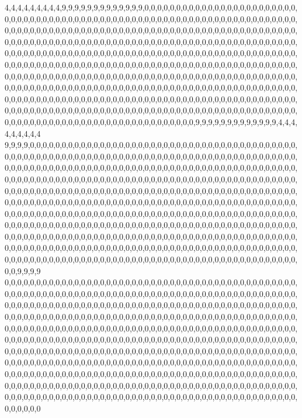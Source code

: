 4,4,4,4,4,4,4,4,4,9,9,9,9,9,9,9,9,9,9,9,9,9,0,0,0,0,0,0,0,0,0,0,0,0,0,0,0,0,0,0,0,0,0,0,0,0,0,0,0,0,0,0,0,0,0,0,0,0,0,0,0,0,0,0,0,0,0,0,0,0,0,0,0,0,0,0,0,0,0,0,0,0,0,0,0,0,0,0,0,0,0,0,0,0,0,0,0,0,0,0,0,0,0,0,0,0,0,0,0,0,0,0,0,0,0,0,0,0,0,0,0,0,0,0,0,0,0,0,0,0,0,0,0,0,0,0,0,0,0,0,0,0,0,0,0,0,0,0,0,0,0,0,0,0,0,0,0,0,0,0,0,0,0,0,0,0,0,0,0,0,0,0,0,0,0,0,0,0,0,0,0,0,0,0,0,0,0,0,0,0,0,0,0,0,0,0,0,0,0,0,0,0,0,0,0,0,0,0,0,0,0,0,0,0,0,0,0,0,0,0,0,0,0,0,0,0,0,0,0,0,0,0,0,0,0,0,0,0,0,0,0,0,0,0,0,0,0,0,0,0,0,0,0,0,0,0,0,0,0,0,0,0,0,0,0,0,0,0,0,0,0,0,0,0,0,0,0,0,0,0,0,0,0,0,0,0,0,0,0,0,0,0,0,0,0,0,0,0,0,0,0,0,0,0,0,0,0,0,0,0,0,0,0,0,0,0,0,0,0,0,0,0,0,0,0,0,0,0,0,0,0,0,0,0,0,0,0,0,0,0,0,0,0,0,0,0,0,0,0,0,0,0,0,0,0,0,0,0,0,0,0,0,0,0,0,0,0,0,0,0,0,0,0,0,0,0,0,0,0,0,0,0,0,0,0,0,0,0,0,0,0,0,0,0,0,0,0,0,0,0,0,0,0,0,0,0,0,0,0,0,0,0,0,0,0,0,0,0,0,0,0,0,0,0,0,0,0,0,0,0,0,0,0,0,0,0,0,0,0,0,0,0,0,0,0,0,0,0,0,0,0,0,0,0,0,0,0,0,0,0,0,0,0,0,0,0,0,0,0,0,0,0,0,0,0,0,0,0,0,0,0,0,0,0,0,0,0,0,0,0,9,9,9,9,9,9,9,9,9,9,9,9,9,4,4,4,4,4,4,4,4,4
9,9,9,9,0,0,0,0,0,0,0,0,0,0,0,0,0,0,0,0,0,0,0,0,0,0,0,0,0,0,0,0,0,0,0,0,0,0,0,0,0,0,0,0,0,0,0,0,0,0,0,0,0,0,0,0,0,0,0,0,0,0,0,0,0,0,0,0,0,0,0,0,0,0,0,0,0,0,0,0,0,0,0,0,0,0,0,0,0,0,0,0,0,0,0,0,0,0,0,0,0,0,0,0,0,0,0,0,0,0,0,0,0,0,0,0,0,0,0,0,0,0,0,0,0,0,0,0,0,0,0,0,0,0,0,0,0,0,0,0,0,0,0,0,0,0,0,0,0,0,0,0,0,0,0,0,0,0,0,0,0,0,0,0,0,0,0,0,0,0,0,0,0,0,0,0,0,0,0,0,0,0,0,0,0,0,0,0,0,0,0,0,0,0,0,0,0,0,0,0,0,0,0,0,0,0,0,0,0,0,0,0,0,0,0,0,0,0,0,0,0,0,0,0,0,0,0,0,0,0,0,0,0,0,0,0,0,0,0,0,0,0,0,0,0,0,0,0,0,0,0,0,0,0,0,0,0,0,0,0,0,0,0,0,0,0,0,0,0,0,0,0,0,0,0,0,0,0,0,0,0,0,0,0,0,0,0,0,0,0,0,0,0,0,0,0,0,0,0,0,0,0,0,0,0,0,0,0,0,0,0,0,0,0,0,0,0,0,0,0,0,0,0,0,0,0,0,0,0,0,0,0,0,0,0,0,0,0,0,0,0,0,0,0,0,0,0,0,0,0,0,0,0,0,0,0,0,0,0,0,0,0,0,0,0,0,0,0,0,0,0,0,0,0,0,0,0,0,0,0,0,0,0,0,0,0,0,0,0,0,0,0,0,0,0,0,0,0,0,0,0,0,0,0,0,0,0,0,0,0,0,0,0,0,0,0,0,0,0,0,0,0,0,0,0,0,0,0,0,0,0,0,0,0,0,0,0,0,0,0,0,0,0,0,0,0,0,0,0,0,0,0,0,0,0,0,0,0,0,0,0,0,0,0,0,0,0,0,0,0,0,0,0,0,0,0,0,0,0,0,0,0,0,0,0,0,0,0,0,0,0,0,0,0,0,0,0,0,0,0,0,0,0,0,0,0,0,0,9,9,9,9
0,0,0,0,0,0,0,0,0,0,0,0,0,0,0,0,0,0,0,0,0,0,0,0,0,0,0,0,0,0,0,0,0,0,0,0,0,0,0,0,0,0,0,0,0,0,0,0,0,0,0,0,0,0,0,0,0,0,0,0,0,0,0,0,0,0,0,0,0,0,0,0,0,0,0,0,0,0,0,0,0,0,0,0,0,0,0,0,0,0,0,0,0,0,0,0,0,0,0,0,0,0,0,0,0,0,0,0,0,0,0,0,0,0,0,0,0,0,0,0,0,0,0,0,0,0,0,0,0,0,0,0,0,0,0,0,0,0,0,0,0,0,0,0,0,0,0,0,0,0,0,0,0,0,0,0,0,0,0,0,0,0,0,0,0,0,0,0,0,0,0,0,0,0,0,0,0,0,0,0,0,0,0,0,0,0,0,0,0,0,0,0,0,0,0,0,0,0,0,0,0,0,0,0,0,0,0,0,0,0,0,0,0,0,0,0,0,0,0,0,0,0,0,0,0,0,0,0,0,0,0,0,0,0,0,0,0,0,0,0,0,0,0,0,0,0,0,0,0,0,0,0,0,0,0,0,0,0,0,0,0,0,0,0,0,0,0,0,0,0,0,0,0,0,0,0,0,0,0,0,0,0,0,0,0,0,0,0,0,0,0,0,0,0,0,0,0,0,0,0,0,0,0,0,0,0,0,0,0,0,0,0,0,0,0,0,0,0,0,0,0,0,0,0,0,0,0,0,0,0,0,0,0,0,0,0,0,0,0,0,0,0,0,0,0,0,0,0,0,0,0,0,0,0,0,0,0,0,0,0,0,0,0,0,0,0,0,0,0,0,0,0,0,0,0,0,0,0,0,0,0,0,0,0,0,0,0,0,0,0,0,0,0,0,0,0,0,0,0,0,0,0,0,0,0,0,0,0,0,0,0,0,0,0,0,0,0,0,0,0,0,0,0,0,0,0,0,0,0,0,0,0,0,0,0,0,0,0,0,0,0,0,0,0,0,0,0,0,0,0,0,0,0,0,0,0,0,0,0,0,0,0,0,0,0,0,0,0,0,0,0,0,0,0,0,0,0,0,0,0,0,0,0,0,0,0,0,0,0,0,0,0,0,0,0,0,0,0,0,0,0,0,0,0,0,0,0,0,0,0,0,0
